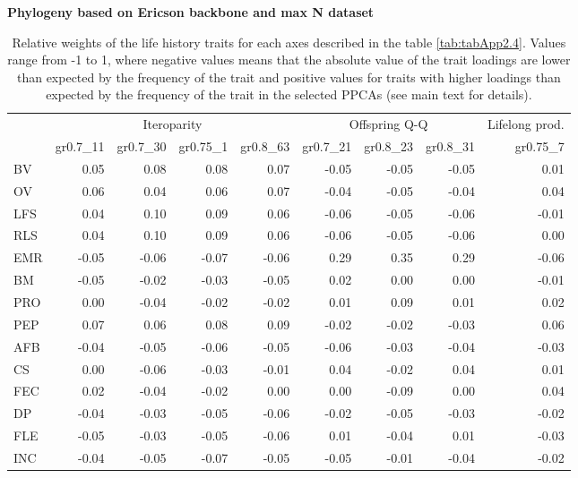 \clearpage%
\begin{landscape}
\begin{table}
\center
\caption[LHT relative importance of the alternative axes]{
Relative weights of the life history traits for each axes described in the
table \ref{tab:tabApp2.4}. Values range from -1 to 1, where negative values
means that the absolute value of the trait loadings are lower than expected by
the frequency of the trait and positive values for traits with higher loadings
than expected by the frequency of the trait in the selected PPCAs (see main
text for details).
}
\label{tab:tabApp2.6}
\begin{footnotesize}

\textbf{Phylogeny based on Ericson backbone and max N dataset}

\begin{tabular}{@{}l|rrrr|rrr|r@{}}
\toprule
 & \multicolumn{4}{c|}{Iteroparity} & \multicolumn{3}{c|}{Offspring Q-Q} & \multicolumn{1}{c}{Lifelong prod.}\\
 & gr0.7\_11 & gr0.7\_30 & gr0.75\_1 & gr0.8\_63 & gr0.7\_21 & gr0.8\_23 & gr0.8\_31 & gr0.75\_7\\
\midrule
BV & 0.05 & 0.08 & 0.08 & 0.07 & -0.05 & -0.05 & -0.05 & 0.01\\
OV & 0.06 & 0.04 & 0.06 & 0.07 & -0.04 & -0.05 & -0.04 & 0.04\\
LFS & 0.04 & 0.10 & 0.09 & 0.06 & -0.06 & -0.05 & -0.06 & -0.01\\
RLS & 0.04 & 0.10 & 0.09 & 0.06 & -0.06 & -0.05 & -0.06 & 0.00\\
EMR & -0.05 & -0.06 & -0.07 & -0.06 & 0.29 & 0.35 & 0.29 & -0.06\\
BM & -0.05 & -0.02 & -0.03 & -0.05 & 0.02 & 0.00 & 0.00 & -0.01\\
PRO & 0.00 & -0.04 & -0.02 & -0.02 & 0.01 & 0.09 & 0.01 & 0.02\\
PEP & 0.07 & 0.06 & 0.08 & 0.09 & -0.02 & -0.02 & -0.03 & 0.06\\
AFB & -0.04 & -0.05 & -0.06 & -0.05 & -0.06 & -0.03 & -0.04 & -0.03\\
CS & 0.00 & -0.06 & -0.03 & -0.01 & 0.04 & -0.02 & 0.04 & 0.01\\
FEC & 0.02 & -0.04 & -0.02 & 0.00 & 0.00 & -0.09 & 0.00 & 0.04\\
DP & -0.04 & -0.03 & -0.05 & -0.06 & -0.02 & -0.05 & -0.03 & -0.02\\
FLE & -0.05 & -0.03 & -0.05 & -0.06 & 0.01 & -0.04 & 0.01 & -0.03\\
INC & -0.04 & -0.05 & -0.07 & -0.05 & -0.05 & -0.01 & -0.04 & -0.02\\
\bottomrule
\end{tabular}


\end{footnotesize}
\end{table}
\end{landscape}
